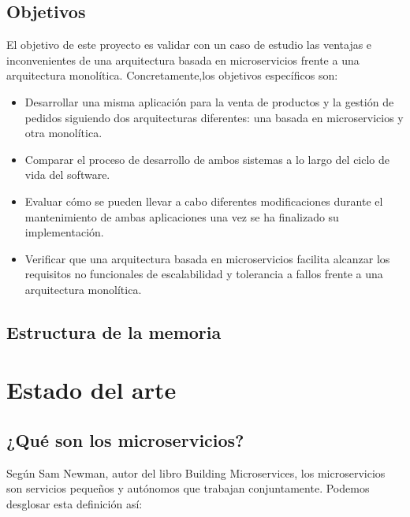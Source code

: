 \documentclass[11pt,spanish,listoffigures,listoftables]{tfgetsinf}
\begin{document}
\section{Objetivos}

El objetivo de este proyecto es validar con un caso de estudio las ventajas e inconvenientes de una arquitectura basada en microservicios frente a una arquitectura monolítica. Concretamente,los objetivos específicos son:

\begin{itemize}

\item Desarrollar una misma aplicación para la venta de productos y la gestión de pedidos siguiendo dos arquitecturas diferentes: una basada en microservicios y otra monolítica.

\item Comparar el proceso de desarrollo de ambos sistemas a lo largo del ciclo de vida del software.

\item Evaluar cómo se pueden llevar a cabo diferentes modificaciones durante el mantenimiento de ambas aplicaciones una vez se ha finalizado su implementación.

\item Verificar que una arquitectura basada en microservicios facilita alcanzar los requisitos no funcionales de escalabilidad y tolerancia a fallos frente a una arquitectura monolítica.

\end{itemize}

\section{Estructura de la memoria}

\chapter{Estado del arte}

\section{¿Qué son los microservicios?}


Según Sam Newman, autor del libro Building Microservices, los microservicios son servicios pequeños y autónomos que trabajan conjuntamente. Podemos desglosar esta definición así:
\end{document}
